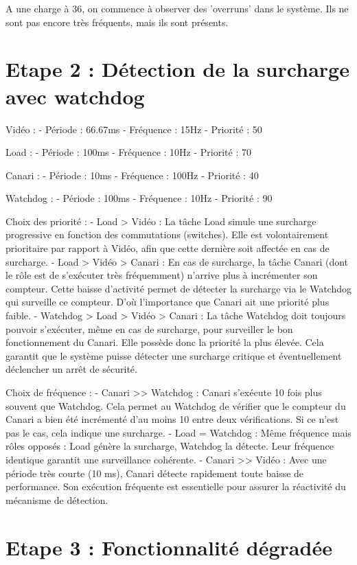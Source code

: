 \documentclass[a4paper,12pt]{article}
\begin{document}
A une charge à 36, on commence à observer des 'overruns' dans le système. Ils ne sont pas encore très fréquents, mais ils sont présents.

\newpage

\section{Etape 2 : Détection de la surcharge avec watchdog}

Vidéo :
- Période : 66.67ms
- Fréquence : 15Hz
- Priorité : 50

Load :
- Période : 100ms
- Fréquence : 10Hz
- Priorité : 70

Canari :
- Période : 10ms
- Fréquence : 100Hz
- Priorité : 40

Watchdog :
- Période : 100ms
- Fréquence : 10Hz
- Priorité : 90

Choix des priorité :
- Load > Vidéo : La tâche Load simule une surcharge progressive en fonction des commutations (switches). Elle est volontairement prioritaire par rapport à Vidéo, afin que cette dernière soit affectée en cas de surcharge.
- Load > Vidéo > Canari : En cas de surcharge, la tâche Canari (dont le rôle est de s'exécuter très fréquemment) n'arrive plus à incrémenter son compteur. Cette baisse d'activité permet de détecter la surcharge via le Watchdog qui surveille ce compteur. D'où l'importance que Canari ait une priorité plus faible.
- Watchdog > Load > Vidéo > Canari : La tâche Watchdog doit toujours pouvoir s'exécuter, même en cas de surcharge, pour surveiller le bon fonctionnement du Canari. Elle possède donc la priorité la plus élevée. Cela garantit que le système puisse détecter une surcharge critique et éventuellement déclencher un arrêt de sécurité.

Choix de fréquence :
- Canari >> Watchdog : Canari s’exécute 10 fois plus souvent que Watchdog. Cela permet au Watchdog de vérifier que le compteur du Canari a bien été incrémenté d’au moins 10 entre deux vérifications. Si ce n’est pas le cas, cela indique une surcharge.
- Load = Watchdog : Même fréquence mais rôles opposés : Load génère la surcharge, Watchdog la détecte. Leur fréquence identique garantit une surveillance cohérente.
- Canari >> Vidéo : Avec une période très courte (10 ms), Canari détecte rapidement toute baisse de performance. Son exécution fréquente est essentielle pour assurer la réactivité du mécanisme de détection.

\newpage

\section{Etape 3 : Fonctionnalité dégradée}
\end{document}
